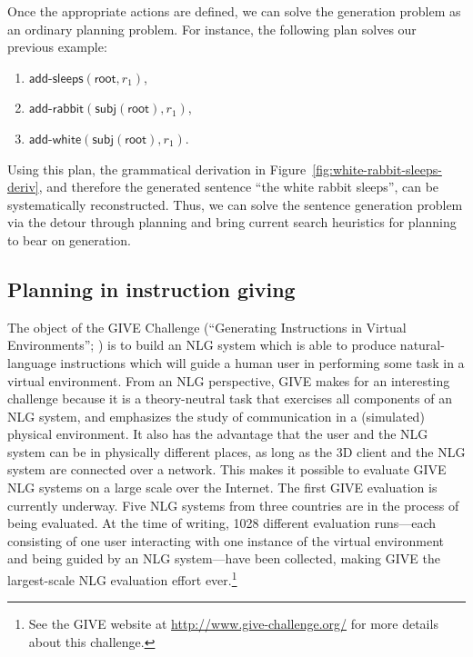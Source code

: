 \documentclass[letterpaper]{article}
\begin{document}
Once the appropriate actions are defined, we can solve the generation
problem as an ordinary planning problem. For instance, the following plan
solves our previous example:
%
\begin{enumerate}
\item $\mathsf{add}\textsf{-}\mathsf{sleeps}(\mathsf{root}, r_1)$,
\item $\mathsf{add}\textsf{-}\mathsf{rabbit}(\mathsf{subj}(\mathsf{root}),r_1)$,
\item $\mathsf{add}\textsf{-}\mathsf{white}(\mathsf{subj}(\mathsf{root}),r_1)$.
\end{enumerate}
%
Using this plan, the grammatical derivation in
Figure~\ref{fig:white-rabbit-sleeps-deriv}, and therefore the
generated sentence ``the white rabbit sleeps'', can be systematically
reconstructed. Thus, we can solve the sentence generation problem via
the detour through planning and bring current search heuristics for
planning to bear on generation.


\subsection{Planning in instruction giving}

The object of the GIVE Challenge (``Generating Instructions in Virtual
Environments''; \citealt{alexander07:_shared_task_propos}) is to build an
NLG system which is able to produce natural-language instructions which
will guide a human user in performing some task in a virtual environment.
From an NLG perspective, GIVE makes for an interesting challenge because it
is a theory-neutral task that exercises all components of an NLG system,
and emphasizes the study of communication in a (simulated) physical
environment. It also has the advantage that the user and the NLG system can
be in physically different places, as long as the 3D client and the NLG
system are connected over a network. This makes it possible to evaluate
GIVE NLG systems on a large scale over the Internet.
%
The first GIVE evaluation is currently underway. Five NLG systems from
three countries are in the process of being evaluated. At the time of
writing, 1028 different evaluation runs---each consisting of one user
interacting with one instance of the virtual environment and being guided
by an NLG system---have been collected, making GIVE the largest-scale
NLG evaluation effort ever.\footnote{See the GIVE website at
 \url{http://www.give-challenge.org/} for more details about this
 challenge.}
\end{document}
